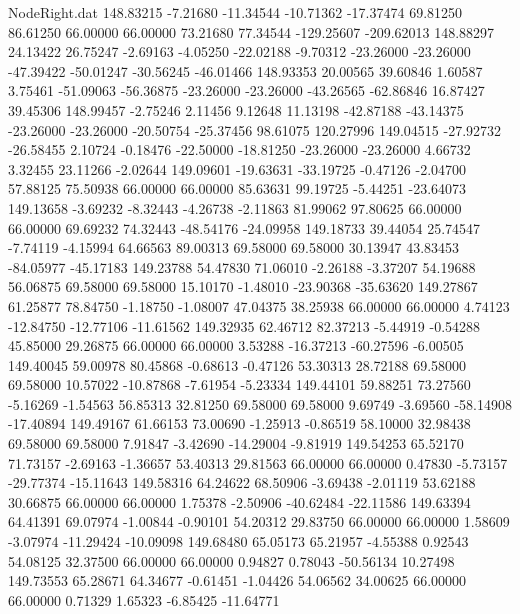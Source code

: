 \begin{filecontents}{NodeRight.dat}
 148.83215   -7.21680  -11.34544   -10.71362  -17.37474   69.81250   86.61250   66.00000   66.00000   73.21680   77.34544 -129.25607 -209.62013
 148.88297   24.13422   26.75247    -2.69163   -4.05250  -22.02188   -9.70312  -23.26000  -23.26000  -47.39422  -50.01247  -30.56245  -46.01466
 148.93353   20.00565   39.60846     1.60587    3.75461  -51.09063  -56.36875  -23.26000  -23.26000  -43.26565  -62.86846   16.87427   39.45306
 148.99457   -2.75246    2.11456     9.12648   11.13198  -42.87188  -43.14375  -23.26000  -23.26000  -20.50754  -25.37456   98.61075  120.27996
 149.04515  -27.92732  -26.58455     2.10724   -0.18476  -22.50000  -18.81250  -23.26000  -23.26000    4.66732    3.32455   23.11266   -2.02644
 149.09601  -19.63631  -33.19725    -0.47126   -2.04700   57.88125   75.50938   66.00000   66.00000   85.63631   99.19725   -5.44251  -23.64073
 149.13658   -3.69232   -8.32443    -4.26738   -2.11863   81.99062   97.80625   66.00000   66.00000   69.69232   74.32443  -48.54176  -24.09958
 149.18733   39.44054   25.74547    -7.74119   -4.15994   64.66563   89.00313   69.58000   69.58000   30.13947   43.83453  -84.05977  -45.17183
 149.23788   54.47830   71.06010    -2.26188   -3.37207   54.19688   56.06875   69.58000   69.58000   15.10170   -1.48010  -23.90368  -35.63620
 149.27867   61.25877   78.84750    -1.18750   -1.08007   47.04375   38.25938   66.00000   66.00000    4.74123  -12.84750  -12.77106  -11.61562
 149.32935   62.46712   82.37213    -5.44919   -0.54288   45.85000   29.26875   66.00000   66.00000    3.53288  -16.37213  -60.27596   -6.00505
 149.40045   59.00978   80.45868    -0.68613   -0.47126   53.30313   28.72188   69.58000   69.58000   10.57022  -10.87868   -7.61954   -5.23334
 149.44101   59.88251   73.27560    -5.16269   -1.54563   56.85313   32.81250   69.58000   69.58000    9.69749   -3.69560  -58.14908  -17.40894
 149.49167   61.66153   73.00690    -1.25913   -0.86519   58.10000   32.98438   69.58000   69.58000    7.91847   -3.42690  -14.29004   -9.81919
 149.54253   65.52170   71.73157    -2.69163   -1.36657   53.40313   29.81563   66.00000   66.00000    0.47830   -5.73157  -29.77374  -15.11643
 149.58316   64.24622   68.50906    -3.69438   -2.01119   53.62188   30.66875   66.00000   66.00000    1.75378   -2.50906  -40.62484  -22.11586
 149.63394   64.41391   69.07974    -1.00844   -0.90101   54.20312   29.83750   66.00000   66.00000    1.58609   -3.07974  -11.29424  -10.09098
 149.68480   65.05173   65.21957    -4.55388    0.92543   54.08125   32.37500   66.00000   66.00000    0.94827    0.78043  -50.56134   10.27498
 149.73553   65.28671   64.34677    -0.61451   -1.04426   54.06562   34.00625   66.00000   66.00000    0.71329    1.65323   -6.85425  -11.64771

\end{filecontents}
